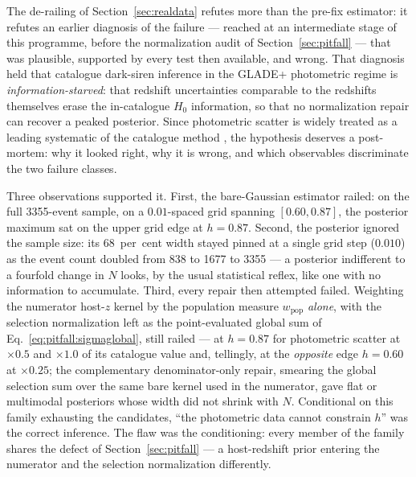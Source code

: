 The de-railing of Section~\ref{sec:realdata} refutes more than the pre-fix estimator: it refutes an earlier diagnosis of the failure --- reached at an intermediate stage of this programme, before the normalization audit of Section~\ref{sec:pitfall} --- that was plausible, supported by every test then available, and wrong. That diagnosis held that catalogue dark-siren inference in the GLADE+ photometric regime is \emph{information-starved}: that redshift uncertainties comparable to the redshifts themselves erase the in-catalogue $H_0$ information, so that no normalization repair can recover a peaked posterior. Since photometric scatter is widely treated as a leading systematic of the catalogue method \citep{Gray:2019ksv,Turski:2023lxq}, the hypothesis deserves a post-mortem: why it looked right, why it is wrong, and which observables discriminate the two failure classes.

Three observations supported it. First, the bare-Gaussian estimator railed: on the full 3355-event sample, on a $0.01$-spaced grid spanning $[0.60, 0.87]$, the posterior maximum sat on the upper grid edge at $h = 0.87$. %
Second, the posterior ignored the sample size: its 68~per~cent width stayed pinned at a single grid step ($0.010$) as the event count doubled from 838 to 1677 to 3355 --- a posterior indifferent to a fourfold change in $N$ looks, by the usual statistical reflex, like one with no information to accumulate. %
Third, every repair then attempted failed. Weighting the numerator host-$z$ kernel by the population measure $w_{\mathrm{pop}}$ \emph{alone}, with the selection normalization left as the point-evaluated global sum of Eq.~\eqref{eq:pitfall:sigmaglobal}, still railed --- at $h = 0.87$ for photometric scatter at $\times 0.5$ and $\times 1.0$ of its catalogue value and, tellingly, at the \emph{opposite} edge $h = 0.60$ at $\times 0.25$; %
the complementary denominator-only repair, smearing the global selection sum over the same bare kernel used in the numerator, gave flat or multimodal posteriors whose width did not shrink with $N$. %
Conditional on this family exhausting the candidates, ``the photometric data cannot constrain $h$'' was the correct inference. The flaw was the conditioning: every member of the family shares the defect of Section~\ref{sec:pitfall} --- a host-redshift prior entering the numerator and the selection normalization differently.

